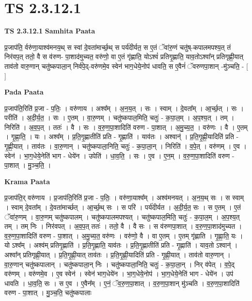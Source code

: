 \documentclass[17pt]{extarticle}
\begin{document}
\section{ TS 2.3.12.1 }

\textbf{TS 2.3.12.1 } \newline
\textbf{Samhita Paata} \newline

प्र॒जाप॑ति॒ र्वरु॑णा॒याश्व॑मनय॒थ् स स्वां दे॒वता॑मार्च्छ॒थ् स पर्य॑दीर्यत॒ स ए॒तं ॅवा॑रु॒णं चतु॑ष्-कपालमपश्य॒त् तं निर॑वप॒त् ततो॒ वै स व॑रुण- पा॒शाद॑मुच्यत॒ वरु॑णो॒ वा ए॒तं गृ॑ह्णाति॒ योऽश्वं॑ प्रतिगृ॒ह्णाति॒ याव॒तोऽश्वा᳚न् प्रतिगृह्णी॒यात् ताव॑तो वारु॒णान् चतु॑ष्कपाला॒न् निर्व॑पे॒द्-वरु॑णमे॒व स्वेन॑ भाग॒धेये॒नोप॑ धावति॒ स ए॒वैनं॑ ॅवरुणपा॒शान् -मु॑ञ्चति॒ - [  ] \newline

\textbf{Pada Paata} \newline

प्र॒जाप॑ति॒रिति॑ प्र॒जा - प॒तिः॒ । वरु॑णाय । अश्व᳚म् । अ॒न॒य॒त् । सः । स्वाम् । दे॒वता᳚म् । आ॒र्च्छ॒त् । सः । परीति॑ । अ॒दी॒र्य॒त॒ । सः । ए॒तम् । वा॒रु॒णम् । चतु॑ष्कपाल॒मिति॒ चतुः॑ - क॒पा॒ल॒म् । अ॒प॒श्य॒त् । तम् । निरिति॑ । अ॒व॒प॒त् । ततः॑ । वै । सः । व॒रु॒ण॒पा॒शादिति॑ वरुण - पा॒शात् । अ॒मु॒च्य॒त॒ । वरु॑णः । वै । ए॒तम् । गृ॒ह्णा॒ति॒ । यः । अश्व᳚म् । प्र॒ति॒गृ॒ह्णातीति॑ प्रति - गृ॒ह्णाति॑ । याव॑तः । अश्वान्॑ । प्र॒ति॒गृ॒ह्णी॒यादिति॑ प्रति - गृ॒ह्णी॒यात् । ताव॑तः । वा॒रु॒णान् । चतु॑ष्कपाला॒निति॒ चतुः॑ - क॒पा॒ला॒न् । निरिति॑ । व॒पे॒त् । वरु॑णम् । ए॒व । स्वेन॑ । भा॒ग॒धेये॒नेति॑ भाग - धेये॑न । उपेति॑ । धा॒व॒ति॒ । सः । ए॒व । ए॒न॒म् । व॒रु॒ण॒पा॒शादिति॑ वरुण - पा॒शात् । मु॒ञ्च॒ति॒ ।  \newline


\textbf{Krama Paata} \newline

प्र॒जाप॑ति॒र् वरु॑णाय । प्र॒जाप॑ति॒रिति॑ प्र॒जा - प॒तिः॒ । वरु॑णा॒याश्व᳚म् । अश्व॑मनयत् । अ॒न॒य॒थ् सः । स स्वाम् । स्वाम् दे॒वता᳚म् । दे॒वता॑मार्च्छत् । आ॒र्च्छ॒थ् सः । स परि॑ । पर्य॑दीर्यत । अ॒दी॒र्य॒त॒ सः । स ए॒तम् । ए॒तं ॅवा॑रु॒णम् । वा॒रु॒णम् चतु॑ष्कपालम् । चतु॑ष्कपालमपश्यत् । चतु॑ष्कपाल॒मिति॒ चतुः॑ - क॒पा॒ल॒म् । अ॒प॒श्य॒त् तम् । तम् निः । निर॑वपत् । अ॒व॒प॒त् ततः॑ । ततो॒ वै । वै सः । स व॑रुणपा॒शात् । व॒रु॒ण॒पा॒शाद॑मुच्यत । व॒रु॒ण॒पा॒शादिति॑ वरुण - पा॒शात् । अ॒मु॒च्य॒त॒ वरु॑णः । वरु॑णो॒ वै । वा ए॒तम् । ए॒तम् गृ॑ह्णाति । गृ॒ह्णा॒ति॒ यः । यो ऽश्व᳚म् । अश्व॑म् प्रतिगृ॒ह्णाति॑ । प्र॒ति॒गृ॒ह्णाति॒ याव॑तः । प्र॒ति॒गृ॒ह्णातीति॑ प्रति - गृ॒ह्णाति॑ । याव॒तो ऽश्वान्॑ । अश्वा᳚न् प्रतिगृह्णी॒यात् । प्र॒ति॒गृ॒ह्णी॒यात् ताव॑तः । प्र॒ति॒गृ॒ह्णी॒यादिति॑ प्रति - गृ॒ह्णी॒यात् । ताव॑तो वारु॒णान् । वा॒रु॒णान् चतु॑ष्कपालान् । चतु॑ष्कपाला॒न् निः । चतु॑ष्कपाला॒निति॒ चतुः॑ - क॒पा॒ला॒न् । निर् व॑पेत् । व॒पे॒द् वरु॑णम् । वरु॑णमे॒व । ए॒व स्वेन॑ । स्वेन॑ भाग॒धेये॑न । भा॒ग॒धेये॒नोप॑ । भा॒ग॒धेये॒नेति॑ भाग - धेये॑न । उप॑ धावति । धा॒व॒ति॒ सः । स ए॒व । ए॒वैन᳚म् । ए॒नं॒ ॅव॒रु॒ण॒पा॒शात् । व॒रु॒ण॒पा॒शान् मु॑ञ्चति । व॒रु॒ण॒पा॒शादिति॑ वरुण - पा॒शात् । मु॒ञ्च॒ति॒ चतु॑ष्कपालाः \newline
\end{document}
